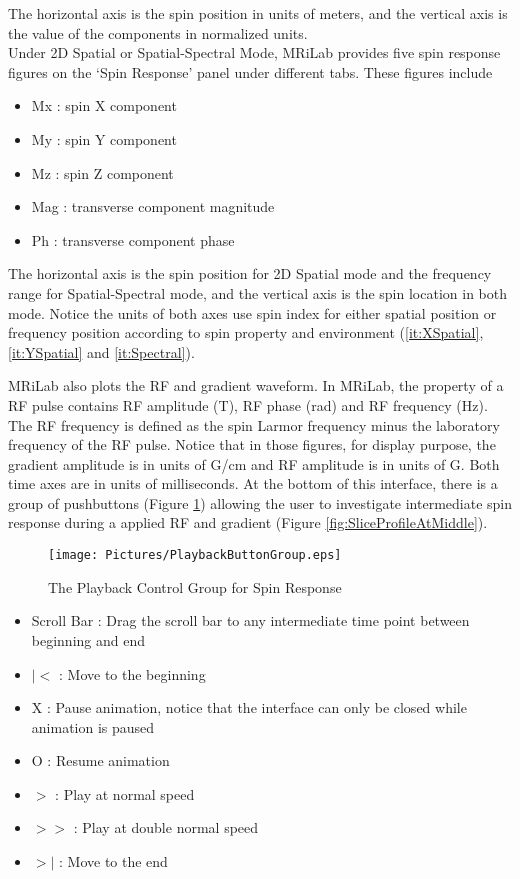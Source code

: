 \documentclass{book}%
\begin{document}
\begin{enumerate}
The horizontal axis is the spin position in units of meters, and the vertical axis is the value of the components in normalized units. \\

Under 2D Spatial or Spatial-Spectral Mode, MRiLab provides five spin response figures on the `Spin Response' panel under different tabs. These figures include

\begin{itemize}
	\item Mx : spin X component
	\item My : spin Y component
	\item Mz : spin Z component
	\item Mag : transverse component magnitude
	\item Ph : transverse component phase
\end{itemize}

The horizontal axis is the spin position for 2D Spatial mode and the frequency range for Spatial-Spectral mode, and the vertical axis is the spin location in both mode. Notice the units of both axes use spin index for either spatial position or frequency position according to spin property and environment (\ref{it:XSpatial}, \ref{it:YSpatial} and \ref{it:Spectral}). 

MRiLab also plots the RF and gradient waveform. In MRiLab, the property of a RF pulse contains RF amplitude (T), RF phase (rad) and RF frequency (Hz). The RF frequency is defined as the spin Larmor frequency minus the laboratory frequency of the RF pulse. Notice that in those figures, for display purpose, the gradient amplitude is in units of G/cm and RF amplitude is in units of G. Both time axes are in units of milliseconds. At the bottom of this interface, there is a group of pushbuttons (Figure \ref{fig:PlaybackButtonGroup}) allowing the user to investigate intermediate spin response during a applied RF and gradient (Figure \ref{fig:SliceProfileAtMiddle}). 

\begin{figure}[htbp]
	\centering
		\texttt{[image: Pictures/PlaybackButtonGroup.eps]}
	\caption{The Playback Control Group for Spin Response}
	\label{fig:PlaybackButtonGroup}
\end{figure}

\begin{itemize}
	\item Scroll Bar : Drag the scroll bar to any intermediate time point between beginning and end 
	\item $\vert <$ : Move to the beginning
	\item X : Pause animation, notice that the interface can only be closed while animation is paused
	\item O : Resume animation
	\item $> $ : Play at normal speed
	\item $>>$ : Play at double normal speed
	\item $> \vert$ : Move to the end
\end{itemize}


\end{enumerate}
\end{document}
